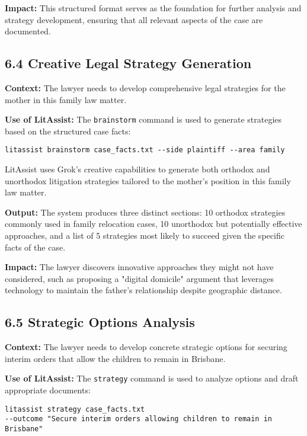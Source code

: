 \documentclass[12pt,a4paper]{article}
\begin{document}
\textbf{Impact:} This structured format serves as the foundation for further analysis and strategy development, ensuring that all relevant aspects of the case are documented.

\subsection*{6.4 Creative Legal Strategy Generation}

\textbf{Context:} The lawyer needs to develop comprehensive legal strategies for the mother in this family law matter.

\textbf{Use of LitAssist:} The \texttt{brainstorm} command is used to generate strategies based on the structured case facts:

\begin{verbatim}
litassist brainstorm case_facts.txt --side plaintiff --area family
\end{verbatim}

LitAssist uses Grok's creative capabilities to generate both orthodox and unorthodox litigation strategies tailored to the mother's position in this family law matter.

\textbf{Output:} The system produces three distinct sections: 10 orthodox strategies commonly used in family relocation cases, 10 unorthodox but potentially effective approaches, and a list of 5 strategies most likely to succeed given the specific facts of the case.

\textbf{Impact:} The lawyer discovers innovative approaches they might not have considered, such as proposing a "digital domicile" argument that leverages technology to maintain the father's relationship despite geographic distance.

\subsection*{6.5 Strategic Options Analysis}

\textbf{Context:} The lawyer needs to develop concrete strategic options for securing interim orders that allow the children to remain in Brisbane.

\textbf{Use of LitAssist:} The \texttt{strategy} command is used to analyze options and draft appropriate documents:

\begin{verbatim}
litassist strategy case_facts.txt 
--outcome "Secure interim orders allowing children to remain in Brisbane"
\end{verbatim}
\end{document}
